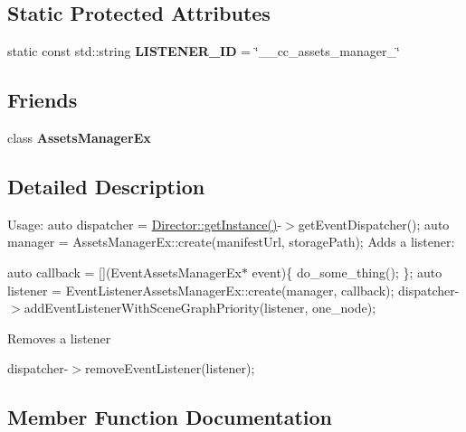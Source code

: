\subsection*{Static Protected Attributes}
\begin{DoxyCompactItemize}
\item 
\mbox{\label{classEventListenerAssetsManagerEx_a6cdff3279710db31f7a32dc3fc849d5b}} 
static const std\+::string {\bfseries L\+I\+S\+T\+E\+N\+E\+R\+\_\+\+ID} = \char`\"{}\+\_\+\+\_\+cc\+\_\+assets\+\_\+manager\+\_\+\char`\"{}
\end{DoxyCompactItemize}
\subsection*{Friends}
\begin{DoxyCompactItemize}
\item 
\mbox{\label{classEventListenerAssetsManagerEx_ab7c03d53ce1728b650be327ea3cd0506}} 
class {\bfseries Assets\+Manager\+Ex}
\end{DoxyCompactItemize}


\subsection{Detailed Description}
Usage\+: auto dispatcher = \hyperlink{classDirector_a8d2a4ca9e20cd400ddadd516efa111e0}{Director\+::get\+Instance()}-\/$>$get\+Event\+Dispatcher(); auto manager = Assets\+Manager\+Ex\+::create(manifest\+Url, storage\+Path); Adds a listener\+:

auto callback = \mbox{[}\mbox{]}(Event\+Assets\+Manager\+Ex$\ast$ event)\{ do\+\_\+some\+\_\+thing(); \}; auto listener = Event\+Listener\+Assets\+Manager\+Ex\+::create(manager, callback); dispatcher-\/$>$add\+Event\+Listener\+With\+Scene\+Graph\+Priority(listener, one\+\_\+node);

Removes a listener

dispatcher-\/$>$remove\+Event\+Listener(listener); 

\subsection{Member Function Documentation}
\mbox{\label{classEventListenerAssetsManagerEx_ab3d0581850c89016c1b9737c75e110ac}} 
